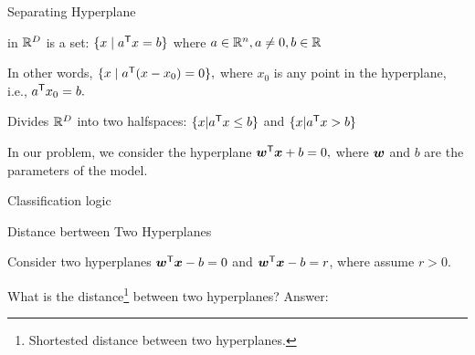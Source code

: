 \documentclass[handout,fleqn,aspectratio=169]{beamer}
\begin{document}
\begin{frame}{Separating Hyperplane}

\plitemsep 0.07in

\bci

\item {} in ${\mathbb R}^{D}$ is a set:
$\{x \mid {a}^{\mathsf{T}}x=b\}$ where $a\in{\mathbb R}^{n}, a\neq 0, b\in{\mathbb R}$ \hfill {}

In other words, $\{ x \mid {a}^{\mathsf{T}}(x-x_0) =0\},$ where $x_0$ is any point in
the hyperplane, i.e., ${a}^{\mathsf{T}} x_0 = b.$

{
\item Divides ${\mathbb R}^{D}$ into two {\blue halfspaces}: 
$\{x|{a}^{\mathsf{T}}x\leq b\}$ and $\{x|{a}^{\mathsf{T}}x>b\}$
}
{
\vspace{-0.3cm}
}
\vspace{-0.2cm}
\item In our problem, we consider the hyperplane ${\bm{w}}^{\mathsf{T}}\bm{x} + b=0,$ where $\bm{w}$ and $b$ are the parameters of the model.

\item Classification logic

\eci
\end{frame}

\begin{frame}{Distance bertween Two Hyperplanes}

\plitemsep 0.07in

\bci

\item Consider two hyperplanes ${\bm{w}}^{\mathsf{T}}\bm{x} - b =0$ and ${\bm{w}}^{\mathsf{T}}\bm{x} - b= r$, where assume $r >0.$

\item \question What is the distance\footnote{Shortested distance between two hyperplanes.} between two hyperplanes? Answer: 
\eci

\vspace{-0.7cm}




\end{frame}
\end{document}
